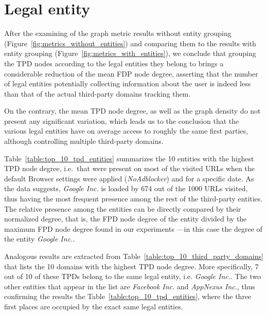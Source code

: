 \section{Legal entity}
After the examining of the graph metric results without entity grouping (Figure~\ref{fig:metrics_without_entities}) and comparing them to the results with entity grouping (Figure~\ref{fig:metrics_with_entities}), we conclude that grouping the TPD nodes according to the legal entities they belong to brings a considerable reduction of the mean FDP node degree, asserting that the number of legal entities potentially collecting information about the user is indeed less than that of the actual third-party domains tracking them.

On the contrary, the mean TPD node degree, as well as the graph density do not present any significant variation, which leads us to the conclusion that the various legal entities have on average access to roughly the same first parties, although controlling multiple third-party domains.

Table~\ref{table:top_10_tpd_entities} summarizes the 10 entities with the highest TPD node degree, i.e.\ that were present on most of the visited URLs when the default Browser settings were applied (\textit{NoAdblocker}) and for a specific date. As the data suggests, \textit{Google Inc.} is loaded by 674 out of the 1000 URLs visited, thus having the most frequent presence among the rest of the third-party entities. The relative presence among the entities can be directly compared by their normalized degree, that is, the FPD node degree of the entity divided by the maximum FPD node degree found in our experiments ---in this case the degree of the entity \textit{Google Inc.}.

Analogous results are extracted from Table~\ref{table:top_10_third_party_domains} that lists the 10 domains with the highest TPD node degree. More specifically, 7 out of 10 of these TPDs belong to the same legal entity, i.e. \textit{Google Inc.}. The two other entities that appear in the list are \textit{Facebook Inc.} and \textit{AppNexus Inc.}, thus confirming the results the Table~\ref{table:top_10_tpd_entities}, where the three first places are occupied by the exact same legal entities.

